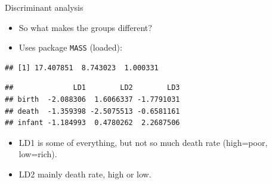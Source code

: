 \documentclass[ignorenonframetext,]{beamer}
\newenvironment{Shaded}{\begin{snugshade}}{\end{snugshade}}
\newcommand{\DataTypeTok}[1]{\textcolor[rgb]{0.13,0.29,0.53}{#1}}
\newcommand{\KeywordTok}[1]{\textcolor[rgb]{0.13,0.29,0.53}{\textbf{#1}}}
\newcommand{\NormalTok}[1]{#1}
\newcommand{\OperatorTok}[1]{\textcolor[rgb]{0.81,0.36,0.00}{\textbf{#1}}}
\newcommand{\StringTok}[1]{\textcolor[rgb]{0.31,0.60,0.02}{#1}}
\begin{document}
\begin{frame}[fragile]{Discriminant analysis}
\protect\hypertarget{discriminant-analysis-4}{}

\begin{itemize}
\item
  So what makes the groups different?
\item
  Uses package \texttt{MASS} (loaded):
\end{itemize}

\footnotesize

\begin{Shaded}
\end{Shaded}

\begin{verbatim}
## [1] 17.407851  8.743023  1.000331
\end{verbatim}

\begin{Shaded}
\end{Shaded}

\begin{verbatim}
##              LD1        LD2        LD3
## birth  -2.088306  1.6066337 -1.7791031
## death  -1.359398 -2.5075513 -0.6581161
## infant -1.184993  0.4780262  2.2687506
\end{verbatim}

\normalsize

\begin{itemize}
\item
  LD1 is some of everything, but not so much death rate (high=poor,
  low=rich).
\item
  LD2 mainly death rate, high or low.
\end{itemize}

\end{frame}
\end{document}
